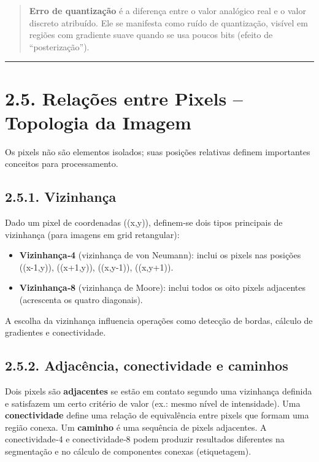 \documentclass[
  portuguese,
  letterpaper,
  openany,
  oneside,
  12pt,
  a4paper]{book}
\providecommand{\tightlist}{%
  \setlength{\itemsep}{0pt}\setlength{\parskip}{0pt}}
\begin{document}
\begin{tcolorbox}
\begin{quote}
\textbf{Erro de quantização} é a diferença entre o valor analógico real
e o valor discreto atribuído. Ele se manifesta como ruído de
quantização, visível em regiões com gradiente suave quando se usa poucos
bits (efeito de ``posterização'').
\end{quote}

\begin{center}\rule{0.5\linewidth}{0.5pt}\end{center}

\section{2.5. Relações entre Pixels -- Topologia da
Imagem}\label{relauxe7uxf5es-entre-pixels-topologia-da-imagem}

Os pixels não são elementos isolados; suas posições relativas definem
importantes conceitos para processamento.

\subsection{2.5.1. Vizinhança}\label{vizinhanuxe7a}

Dado um pixel de coordenadas ((x,y)), definem‑se dois tipos principais
de vizinhança (para imagens em grid retangular):

\begin{itemize}
\tightlist
\item
  \textbf{Vizinhança‑4} (vizinhança de von Neumann): inclui os pixels
  nas posições ((x-1,y)), ((x+1,y)), ((x,y-1)), ((x,y+1)).
\item
  \textbf{Vizinhança‑8} (vizinhança de Moore): inclui todos os oito
  pixels adjacentes (acrescenta os quatro diagonais).
\end{itemize}

A escolha da vizinhança influencia operações como detecção de bordas,
cálculo de gradientes e conectividade.

\subsection{2.5.2. Adjacência, conectividade e
caminhos}\label{adjacuxeancia-conectividade-e-caminhos}

Dois pixels são \textbf{adjacentes} se estão em contato segundo uma
vizinhança definida e satisfazem um certo critério de valor (ex.: mesmo
nível de intensidade). Uma \textbf{conectividade} define uma relação de
equivalência entre pixels que formam uma região conexa. Um
\textbf{caminho} é uma sequência de pixels adjacentes. A conectividade‑4
e conectividade‑8 podem produzir resultados diferentes na segmentação e
no cálculo de componentes conexas (etiquetagem).


\end{tcolorbox}
\end{document}
